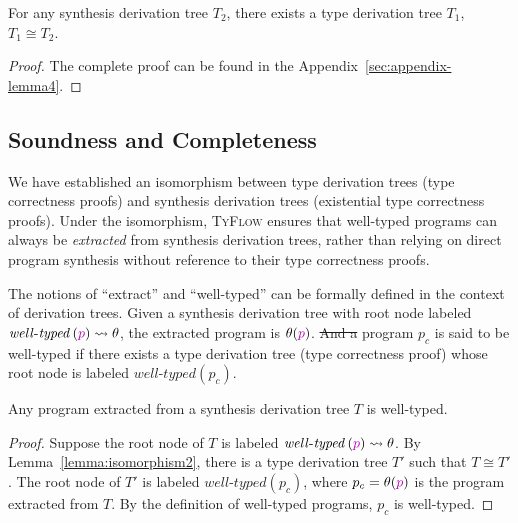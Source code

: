 \documentclass[manuscript,screen]{acmart}
\makeatletter
\newcommand{\sk}[1]{\textcolor{skunknown}{#1}}
\newcommand{\welltyped}[1]{\mathit{well\text{-}typed}\left(#1\right)}
\newcommand{\toolname}[1]{\textsc{#1}}
\newcommand{\mainname}{\toolname{TyFlow}\xspace}
\providecommand{\DIFadd}[1]{{\protect\color{blue}\uwave{#1}}} %
\providecommand{\DIFdel}[1]{{\protect\color{red}\sout{#1}}} %
\providecommand{\DIFaddbegin}{} %
\providecommand{\DIFaddend}{} %
\providecommand{\DIFdelbegin}{} %
\providecommand{\DIFdelend}{} %
\providecommand{\DIFscaledelfig}{0.5}
\newlength{\DIFdelgraphicswidth} %
\newlength{\DIFdelgraphicsheight} %
\providecommand{\DIFaddincludegraphics}[2][]{{\color{blue}\fbox{\DIFOincludegraphics[#1]{#2}}}} %
\providecommand{\DIFdelincludegraphics}[2][]{%
\sbox{\DIFdelgraphicsbox}{\DIFOincludegraphics[#1]{#2}}%
\settoboxwidth{\DIFdelgraphicswidth}{\DIFdelgraphicsbox} %
\settoboxtotalheight{\DIFdelgraphicsheight}{\DIFdelgraphicsbox} %
\scalebox{\DIFscaledelfig}{%
\parbox[b]{\DIFdelgraphicswidth}{\usebox{\DIFdelgraphicsbox}\\[-\baselineskip] \rule{\DIFdelgraphicswidth}{0em}}\llap{\resizebox{\DIFdelgraphicswidth}{\DIFdelgraphicsheight}{%
\setlength{\unitlength}{\DIFdelgraphicswidth}%
\begin{picture}(1,1)%
\thicklines\linethickness{2pt} %
{\color[rgb]{1,0,0}\put(0,0){\framebox(1,1){}}}%
{\color[rgb]{1,0,0}\put(0,0){\line( 1,1){1}}}%
{\color[rgb]{1,0,0}\put(0,1){\line(1,-1){1}}}%
\end{picture}%
}\hspace*{3pt}}} %
} %
\DeclareRobustCommand{\DIFaddbegin}{\DIFOaddbegin \let\includegraphics\DIFaddincludegraphics} %
\DeclareRobustCommand{\DIFaddend}{\DIFOaddend \let\includegraphics\DIFOincludegraphics} %
\DeclareRobustCommand{\DIFdelbegin}{\DIFOdelbegin \let\includegraphics\DIFdelincludegraphics} %
\DeclareRobustCommand{\DIFdelend}{\DIFOaddend \let\includegraphics\DIFOincludegraphics} %
\let\sout@orig\sout %
\renewcommand{\sout}[1]{\ifmmode\text{\sout@orig{\ensuremath{#1}}}\else\sout@orig{#1}\fi} %
\makeatother
\begin{document}
\begin{lemma}
\label{lemma:isomorphism2}
For any synthesis derivation tree $T_2$, there exists a type derivation tree $T_1$, $T_1 \cong T_2$.
\end{lemma}
\begin{proof}
  The complete proof can be found in the Appendix~\ref{sec:appendix-lemma4}.
\end{proof}

\subsection{Soundness and Completeness}
\label{sec:soundness-completeness}
We have established an isomorphism between type derivation trees (type correctness proofs) and synthesis derivation trees (existential type correctness proofs). 
Under the isomorphism, \mainname ensures that well-typed programs can always be \emph{extracted} from synthesis derivation trees, rather than relying on direct program synthesis without reference to their type correctness proofs.

The notions of ``extract'' and ``well-typed'' can be formally defined in the context of derivation trees. 
Given a synthesis derivation tree with root node labeled $\welltyped{\sk{p}} \leadsto \theta$, the extracted program is $\theta(\sk{p})$. \DIFdelbegin \DIFdel{And a }\DIFdelend \DIFaddbegin \DIFadd{A }\DIFaddend program $p_c$ is said to be well-typed if there exists a type derivation tree (type correctness proof) whose root node is labeled $\welltyped{p_c}$.

\begin{theorem}[Soundness]
Any program extracted from a synthesis derivation tree $T$ is well-typed.
\end{theorem}
\begin{proof}
Suppose the root node of $T$ is labeled $\welltyped{\sk{p}} \leadsto \theta$. By Lemma~\ref{lemma:isomorphism2}, there is a type derivation tree $T'$ such that $T \cong T'$. The root node of $T'$ is labeled $\welltyped{p_c}$, where $p_c = \theta(\sk{p})$ is the program extracted from $T$. By the definition of well-typed programs, $p_c$ is well-typed.
\end{proof}
\end{document}
